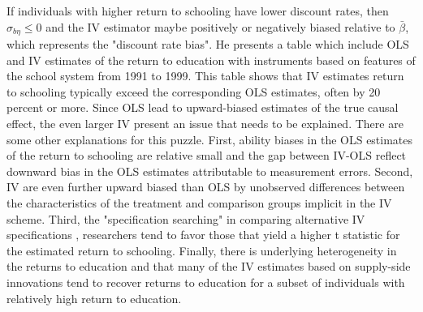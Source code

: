\begin{enumerate}[label=(\alph*)]
If individuals with higher return to schooling have lower discount rates, then $\sigma_{b\eta}\leq0$ and the IV estimator maybe positively or negatively biased relative to $\bar{\beta}$, which represents the "discount rate bias".
He presents a table which include OLS and IV estimates of the return to education with instruments based on features of the school system from 1991 to 1999. This table shows that IV  estimates return to schooling typically exceed the corresponding OLS estimates, often by 20 percent or more. Since OLS lead to upward-biased estimates of the true causal effect, the even larger IV present an issue that needs to be explained. 
There are some other explanations for this puzzle. First, ability biases in the OLS estimates of the return to schooling are relative small and the gap between IV-OLS reflect downward bias in the OLS estimates attributable to measurement errors. 
Second, IV are even further upward biased than OLS by unobserved differences between the characteristics of the treatment and comparison groups implicit in the IV scheme. 
Third, the "specification searching" in comparing alternative IV specifications , researchers tend to favor those that yield a higher t statistic for the estimated return to schooling. 
Finally, there is underlying heterogeneity in the returns to education and that many of the IV estimates based on supply-side innovations tend to recover returns to education for a subset of individuals with relatively high return to education. 


\end{enumerate}